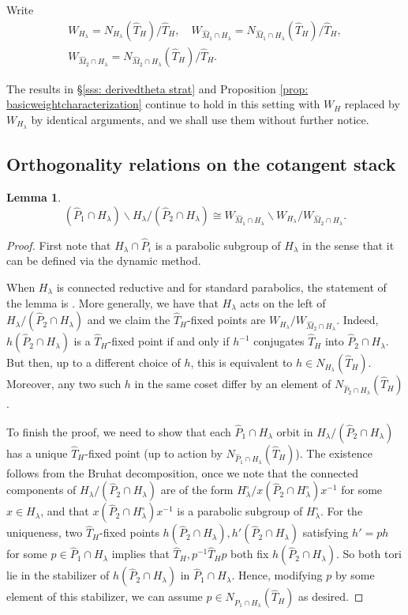 \documentclass{amsart}
\newtheorem{lemma}[theorem]{Lemma}
\theoremstyle{definition}
\theoremstyle{remark}
\numberwithin{equation}{section}
\newcommand{\wh}{\widehat}
\begin{document}
Write
\begin{gather*}
W_{H_\lambda}= N_{H_\lambda}(\wh T_H)/ \wh T_H, \quad
W_{\wh M_1 \cap H_\lambda}= N_{\wh M_1 \cap H_\lambda}(\wh T_H)/ \wh T_H, \\
W_{\wh M_2 \cap H_\lambda}= N_{\wh M_2 \cap H_\lambda}(\wh T_H)/ \wh T_H.
\end{gather*}

The results in \S \ref{sss: derivedtheta strat} and Proposition \ref{prop: basicweightcharacterization} continue to hold in this setting with $W_H$ replaced by $W_{H_\lambda}$ by identical arguments, and we shall use them without further notice.   

\subsection{Orthogonality relations on the cotangent stack}

\begin{lemma}
\[
(\wh P_1 \cap H_\lambda)\backslash H_\lambda / (\wh P_2 \cap H_\lambda) \cong 
W_{\wh M_1 \cap H_\lambda} \backslash W_{H_\lambda} /W_{\wh M_2 \cap H_\lambda}. 
\]
\end{lemma}
\begin{proof}
First note that $H_{\lambda} \cap \wh{P}_i$ is a parabolic subgroup of $H_{\lambda}$ in the sense that it can be defined via the dynamic method. 

When $H_{\lambda}$ is connected reductive and for standard parabolics, the statement of the lemma is \cite[IV.5 Remark 2]{Bou1}. More generally, we have that $H_{\lambda}$ acts on the left of $H_{\lambda} / (\wh{P}_2 \cap H_{\lambda})$ and we claim the $\wh{T}_H$-fixed points are $W_{H_{\lambda}} / W_{\wh{M}_2 \cap H_{\lambda}}$. Indeed, $h(\wh{P}_2 \cap H_{\lambda})$ is a $\wh{T}_H$-fixed point if and only if $h^{-1}$ conjugates $\wh{T}_H$ into $\wh{P}_2 \cap H_{\lambda}$. But then, up to a different choice of $h$, this is equivalent to $h \in N_{H_{\lambda}}(\wh{T}_H)$. Moreover, any two such $h$ in the same coset differ by an element of $N_{\wh{P}_2 \cap H_{\lambda}}(\wh{T}_H)$. 
    
To finish the proof, we need to show that each $\wh{P}_1 \cap H_{\lambda}$ orbit in $H_{\lambda} / (\wh{P}_2 \cap H_{\lambda})$ has a unique $\wh{T}_H$-fixed point (up to action by $N_{\wh{P}_1 \cap H_{\lambda}}(\wh{T}_H)$). The existence follows from the Bruhat decomposition, once we note that the connected components of $H_{\lambda} / (\wh{P}_2 \cap H_{\lambda})$ are of the form $H^{\circ}_{\lambda} / x(\wh{P}_2 \cap H^{\circ}_{\lambda})x^{-1}$ for some $x \in H_{\lambda}$, and that $x(\wh{P}_2 \cap H^{\circ}_{\lambda})x^{-1}$ is a parabolic subgroup of $H^{\circ}_{\lambda}$. For the uniqueness, two $\wh{T}_H$-fixed points $h(\wh{P}_2 \cap H_{\lambda}), h'(\wh{P}_2 \cap H_{\lambda})$ satisfying $h' = ph$ for some $p \in \wh{P}_1 \cap H_{\lambda}$ implies that $\wh{T}_H, p^{-1}
\wh{T}_Hp$ both fix $h(\wh{P}_2 \cap H_{\lambda})$. So both tori lie in the stabilizer of $h(\wh{P}_2 \cap H_{\lambda})$ in $\wh{P}_1 \cap H_{\lambda}$. Hence, modifying $p$ by some element of this stabilizer, we can assume $p \in N_{\wh{P}_1 \cap H_{\lambda}}(\wh{T}_{H})$ as desired.
\end{proof}
\end{document}
